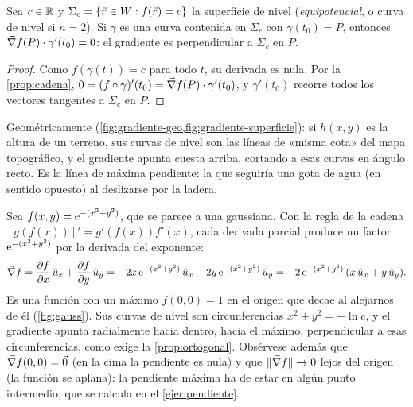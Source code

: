 \begin{proposicion}\label{prop:ortogonal}
Sea $c\in\mathbb{R}$ y $\Sigma_c=\{\vec{r}\in W: f(\vec{r})=c\}$ la superficie de nivel
(\emph{equipotencial}, o curva de nivel si $n=2$). Si $\gamma$ es una curva
contenida en $\Sigma_c$ con $\gamma(t_0)=P$, entonces
$\vec{\nabla} f(P)\cdot\gamma'(t_0)=0$: el gradiente es perpendicular a $\Sigma_c$ en $P$.
\end{proposicion}
\begin{proof}
Como $f(\gamma(t))=c$ para todo $t$, su derivada es nula. Por la
\cref{prop:cadena}, $0=(f\circ\gamma)'(t_0)=\vec{\nabla} f(P)\cdot\gamma'(t_0)$, y
$\gamma'(t_0)$ recorre todos los vectores tangentes a $\Sigma_c$ en $P$.
\end{proof}

Geométricamente (\cref{fig:gradiente-geo,fig:gradiente-superficie}): si $h(x,y)$ es la altura de un
terreno, sus curvas de nivel son las líneas de «misma cota» del mapa
topográfico, y el gradiente apunta cuesta arriba, cortando a esas curvas en
ángulo recto. Es la línea de máxima pendiente: la que seguiría una gota de agua
(en sentido opuesto) al deslizarse por la ladera.





\begin{ejemplo}\label{ej:gaussiana}
Sea $f(x,y)=\mathrm{e}^{-(x^{2}+y^{2})}$, que se parece a una gaussiana. Con la regla
de la cadena $[g(f(x))]'=g'(f(x))f'(x)$, cada derivada parcial produce
un factor $\mathrm{e}^{-(x^{2}+y^{2})}$ por la derivada del exponente:
\[
  \vec{\nabla} f=\frac{\partial f}{\partial x}\,\hat{u}_{x}+\frac{\partial f}{\partial y}\,\hat{u}_{y}
  =-2x\,\mathrm{e}^{-(x^{2}+y^{2})}\,\hat{u}_{x}-2y\,\mathrm{e}^{-(x^{2}+y^{2})}\,\hat{u}_{y}
  =-2\,\mathrm{e}^{-(x^{2}+y^{2})}\,(x\,\hat{u}_{x}+y\,\hat{u}_{y}).
\]
Es una función con un máximo $f(0,0)=1$ en el origen que decae al alejarnos de
él (\cref{fig:gauss}). Sus curvas de nivel son circunferencias
$x^{2}+y^{2}=-\ln c$, y el gradiente apunta radialmente hacia dentro, hacia el
máximo, perpendicular a esas circunferencias, como exige la
\cref{prop:ortogonal}. Obsérvese además que $\vec{\nabla} f(0,0)=\vec{0}$ (en la cima la
pendiente es nula) y que $\lVert \vec{\nabla} f\rVert\to0$ lejos del origen (la función se
aplana): la pendiente máxima ha de estar en algún punto intermedio, que se
calcula en el \cref{ejer:pendiente}.
\end{ejemplo}



